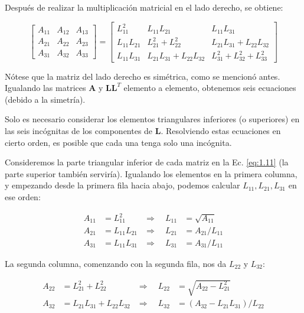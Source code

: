 \documentclass[12pt,letterpaper]{article}
\theoremstyle{definition}
\theoremstyle{plain}
\theoremstyle{remark}
\begin{document}
Después de realizar la multiplicación matricial en el lado derecho, se obtiene:

\[
\begin{bmatrix}
A_{11} & A_{12} & A_{13} \\
A_{21} & A_{22} & A_{23} \\
A_{31} & A_{32} & A_{33}
\end{bmatrix}
=
\begin{bmatrix}
L_{11}^2 & L_{11}L_{21} & L_{11}L_{31} \\
L_{11}L_{21} & L_{21}^2 + L_{22}^2 & L_{21}L_{31} + L_{22}L_{32} \\
L_{11}L_{31} & L_{21}L_{31} + L_{22}L_{32} & L_{31}^2 + L_{32}^2 + L_{33}^2
\end{bmatrix} \label{eq:1.11}
\tag{1.11}
\]

Nótese que la matriz del lado derecho es simétrica, como se mencionó antes. Igualando las matrices $\mathbf{A}$ y $\mathbf{L}\mathbf{L}^T$ elemento a elemento, obtenemos seis ecuaciones (debido a la simetría).

Solo es necesario considerar los elementos triangulares inferiores (o superiores) en las seis incógnitas de los componentes de $\mathbf{L}$. Resolviendo estas ecuaciones en cierto orden, es posible que cada una tenga solo una incógnita.

Consideremos la parte triangular inferior de cada matriz en la Ec. \eqref{eq:1.11} (la parte superior también serviría). Igualando los elementos en la primera columna, y empezando desde la primera fila hacia abajo, podemos calcular $L_{11}, L_{21}, L_{31}$ en ese orden:

\begin{align*}
A_{11} &= L_{11}^2 &\Rightarrow\quad L_{11} &= \sqrt{A_{11}} \\
A_{21} &= L_{11} L_{21} &\Rightarrow\quad L_{21} &= A_{21} / L_{11} \\
A_{31} &= L_{11} L_{31} &\Rightarrow\quad L_{31} &= A_{31} / L_{11}
\end{align*}

La segunda columna, comenzando con la segunda fila, nos da $L_{22}$ y $L_{32}$:

\begin{align*}
A_{22} &= L_{21}^2 + L_{22}^2 &\Rightarrow\quad L_{22} &= \sqrt{A_{22} - L_{21}^2} \\
A_{32} &= L_{21}L_{31} + L_{22}L_{32} &\Rightarrow\quad L_{32} &= (A_{32} - L_{21}L_{31}) / L_{22}
\end{align*}
\end{document}
